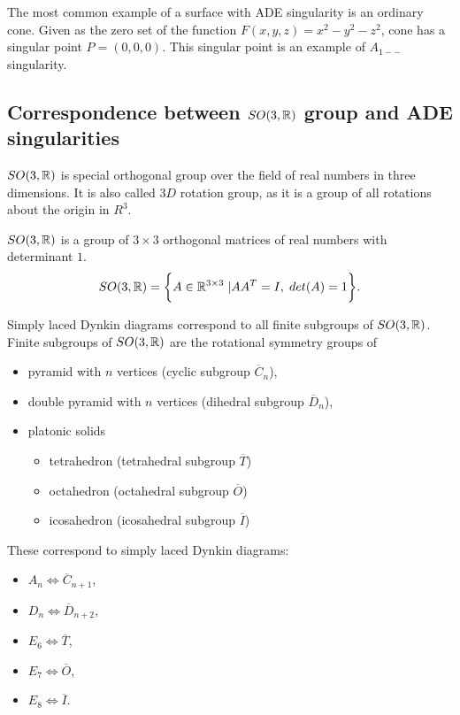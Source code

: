 The most common example of a surface with ADE singularity is an ordinary cone.
Given as the zero set of the function $F(x, y, z)=x^2-y^2-z^2$, cone has
a singular point $P=(0, 0, 0)$. This singular point is an example of $A_{1--}$
singularity.

\subsection*{Correspondence between $SO(3,\mathbb{R})$ group and ADE singularities}
\label{subs2.2.2}
$SO(3, \mathbb{R})$ is special orthogonal group over the field of real numbers 
in three dimensions. It is also called $3D$ rotation group, as it is a group
of all rotations about the origin in $R^3$.
\begin{definition}
    $SO(3, \mathbb{R})$ is a group of $3\times3$ orthogonal matrices
    of real numbers with determinant $1$.
    $$SO(3, \mathbb{R}) = \bigg\{A\in\mathbb{R}^{3\times3} \hspace{1mm} | AA^T=I ,\hspace{1mm} det(A)=1\bigg\}.$$
\end{definition}

Simply laced Dynkin diagrams correspond to all finite subgroups of
$SO(3,\mathbb{R})$. Finite subgroups of
$SO(3,\mathbb{R})$ are the rotational symmetry groups of
\begin{itemize}
    \item pyramid with $n$ vertices (cyclic subgroup $\overline{C}_n$),
    \item double pyramid with $n$ vertices (dihedral subgroup $\overline{D}_n$),
    \item platonic solids
    \begin{itemize}
        \item tetrahedron (tetrahedral subgroup $\overline{T}$)
        \item octahedron (octahedral subgroup $\overline{O}$)
        \item icosahedron (icosahedral subgroup $\overline{I}$)
    \end{itemize}
\end{itemize}

These correspond to simply laced Dynkin diagrams:
\begin{itemize}
    \item $A_n \iff \overline{C}_{n+1}$,
    \item $D_n \iff \overline{D}_{n+2}$,
    \item $E_6 \iff \overline{T}$,
    \item $E_7 \iff \overline{O}$,
    \item $E_8 \iff \overline{I}$.
\end{itemize}

